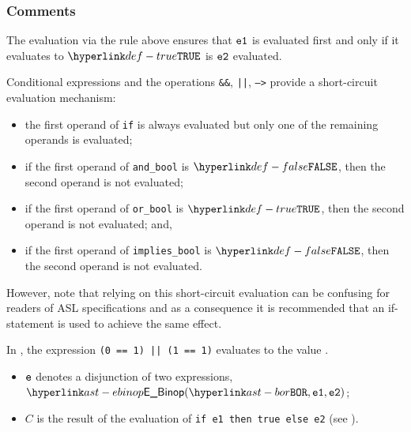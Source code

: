 \subsubsection{Comments}
The evaluation via the rule above ensures that $\veone$ is evaluated first and
only if it evaluates to $\True$ is $\vetwo$ evaluated.


Conditional expressions and the operations \texttt{\&\&}, \texttt{||},
\texttt{-->} provide a short-circuit evaluation mechanism:

\begin{itemize}
\item the first operand of \texttt{if} is always evaluated but only one of the
remaining operands is evaluated;
\item if the first operand of \texttt{and\_bool} is $\False$, then the second operand is not evaluated;
\item if the first operand of \texttt{or\_bool} is $\True$, then the second operand is not evaluated; and,
\item if the first operand of \texttt{implies\_bool} is $\False$, then the
second operand is not evaluated.
\end{itemize}

However, note that relying on this short-circuit evaluation can be confusing
for readers of ASL specifications and as a consequence it is recommended that
an if-statement is used to achieve the same effect.

In , the expression \texttt{(0 == 1) || (1 == 1)} evaluates to the value \True.

\ProseParagraph
\AllApply
\begin{itemize}
\item $\ve$ denotes a disjunction of two expressions, $\EBinop(\BOR, \veone, \vetwo)$;
\item $C$ is the result of the evaluation of
      \texttt{if e1 then true else e2} (see ).
\end{itemize}

\FormallyParagraph
\begin{mathpar}
\end{mathpar}


